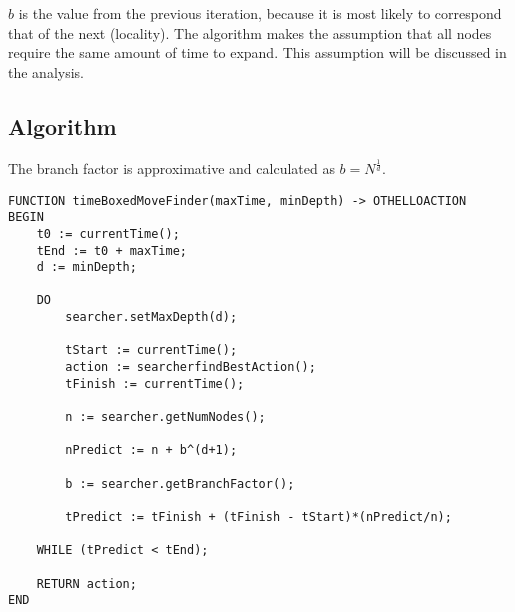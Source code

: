 \documentclass[a4paper,11pt]{article}
\begin{document}
$b$ is the value from the previous iteration, because it is most likely to correspond that of the next (locality). The algorithm makes the assumption that all nodes require the same amount of time to expand. This assumption will be discussed in the analysis.

\subsection{Algorithm}
The branch factor is approximative and calculated as $b = N^{\frac{1}{d}}$.

\begin{lstlisting}
FUNCTION timeBoxedMoveFinder(maxTime, minDepth) -> OTHELLOACTION
BEGIN
	t0 := currentTime();
	tEnd := t0 + maxTime;
	d := minDepth;
	
	DO
		searcher.setMaxDepth(d);
		
		tStart := currentTime();
		action := searcherfindBestAction();
		tFinish := currentTime();
		
		n := searcher.getNumNodes();
		
		nPredict := n + b^(d+1);
		
		b := searcher.getBranchFactor();
		
		tPredict := tFinish + (tFinish - tStart)*(nPredict/n);
		
	WHILE (tPredict < tEnd);
	
	RETURN action;
END
\end{lstlisting}
\end{document}
